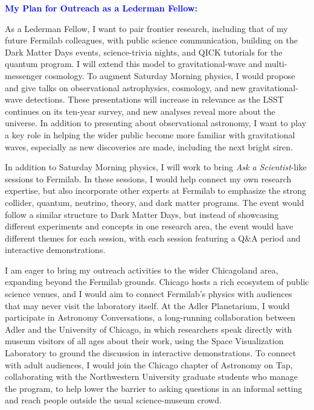 \documentclass[11pt]{article}
\newcommand{\statement}[1]{\par\medskip
  \textcolor{blue}{\textbf{#1:}}%
}
\begin{document}
\statement{My Plan for Outreach as a Lederman Fellow}
As a Lederman Fellow, I want to pair frontier research, including that of my future Fermilab colleagues, with public science communication, building on the Dark Matter Days events, science-trivia nights, and QICK tutorials for the quantum program. I will extend this model to gravitational-wave and multi-messenger cosmology. %
To augment Saturday Morning physics, I would propose and give talks on observational astrophysics, cosmology, and new gravitational-wave detections. These presentations will increase in relevance as the LSST continues on its ten-year survey, and new analyses reveal more about the universe. In addition to presenting about observational astronomy, I want to play a key role in helping the wider public become more familiar with gravitational waves, especially as new discoveries are made, including the next bright siren.

In addition to Saturday Morning physics, I will work to bring \textit{Ask a Scientist}-like sessions to Fermilab. In these sessions, I would help connect my own research expertise, but also incorporate other experts at Fermilab to emphasize the strong collider, quantum, neutrino, theory, and dark matter programs. The event would follow a similar structure to Dark Matter Days, but instead of showcasing different experiments and concepts in one research area, the event would have different themes for each session, with each session featuring a Q\&A period and interactive demonstrations.

I am eager to bring my outreach activities to the wider Chicagoland area, expanding beyond the Fermilab grounds. Chicago hosts a rich ecosystem of public science venues, and I would aim to connect Fermilab's physics with audiences that may never visit the laboratory itself. At the Adler Planetarium, I would participate in Astronomy Conversations, a long-running collaboration between Adler and the University of Chicago, in which researchers speak directly with museum visitors of all ages about their work, using the Space Visualization Laboratory to ground the discussion in interactive demonstrations. 
To connect with adult audiences, I would join the Chicago chapter of Astronomy on Tap, collaborating with the Northwestern University graduate students who manage the program, to help lower the barrier to asking questions in an informal setting and reach people outside the usual science-museum crowd.
\end{document}
